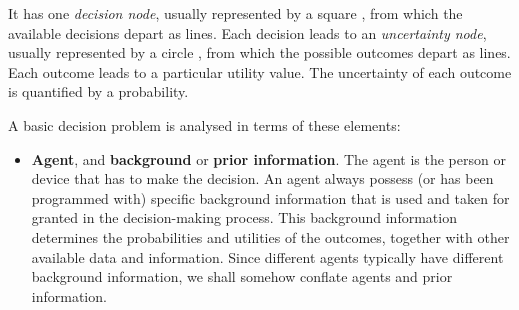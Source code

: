 \documentclass[
  a4paper,
  DIV=11,
  numbers=noendperiod,
  oneside]{scrreprt}
\providecommand{\tightlist}{%
  \setlength{\itemsep}{0pt}\setlength{\parskip}{0pt}}\usepackage{longtable,booktabs,array}
\begin{document}
It has one \emph{decision node}, usually represented by a square
, from which the available decisions depart as lines.
Each decision leads to an \emph{uncertainty node}, usually represented
by a circle , from which the possible outcomes depart as
lines. Each outcome leads to a particular utility value. The uncertainty
of each outcome is quantified by a probability.

A basic decision problem is analysed in terms of these elements:

\begin{itemize}
\tightlist
\item
  { \textbf{Agent}}, and {\textbf{background}} or
  {\textbf{prior information}}. The agent is the person or device that
  has to make the decision. An agent always possess (or has been
  programmed with) specific background information that is used and
  taken for granted in the decision-making process. This background
  information determines the probabilities and utilities of the
  outcomes, together with other available data and information. Since
  different agents typically have different background information, we
  shall somehow conflate agents and prior information.
\end{itemize}

\end{document}
